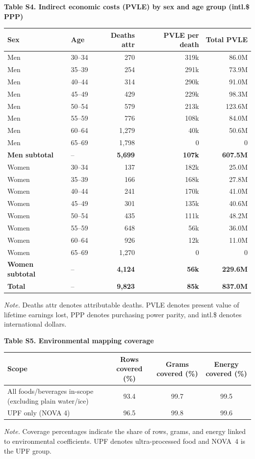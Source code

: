 ﻿\documentclass{article}
\newcommand{\manualtablecaption}[1]{%
  \par\centering\textbf{#1}\par\vspace{0.4em}%
}
\newcommand{\tabnote}[1]{%
  \vspace{0.06cm}%
  {\footnotesize\setstretch{1}\par\raggedright\textit{Note.} #1\par}%
}
\begin{document}
\vspace{0.8em}
\begin{table}[!htbp]
\centering
\manualtablecaption{Table S4. Indirect economic costs (PVLE) by sex and age group (intl.\$ PPP)}
\begin{tabular}{l l r r r}
\toprule
\textbf{Sex} & \textbf{Age} & \textbf{Deaths attr} & \textbf{PVLE per death} & \textbf{Total PVLE}\\
\midrule
Men & 30--34 & 270 & 319k & 86.0M\\
Men & 35--39 & 254 & 291k & 73.9M\\
Men & 40--44 & 314 & 290k & 91.0M\\
Men & 45--49 & 429 & 229k & 98.3M\\
Men & 50--54 & 579 & 213k & 123.6M\\
Men & 55--59 & 776 & 108k & 84.0M\\
Men & 60--64 & 1,279 & 40k & 50.6M\\
Men & 65--69 & 1,798 & 0 & 0\\
\textbf{Men subtotal} & -- & \textbf{5,699} & \textbf{107k} & \textbf{607.5M}\\
Women & 30--34 & 137 & 182k & 25.0M\\
Women & 35--39 & 166 & 168k & 27.8M\\
Women & 40--44 & 241 & 170k & 41.0M\\
Women & 45--49 & 301 & 135k & 40.6M\\
Women & 50--54 & 435 & 111k & 48.2M\\
Women & 55--59 & 648 & 56k & 36.0M\\
Women & 60--64 & 926 & 12k & 11.0M\\
Women & 65--69 & 1,270 & 0 & 0\\
\textbf{Women subtotal} & -- & \textbf{4,124} & \textbf{56k} & \textbf{229.6M}\\
\midrule
\textbf{Total} & -- & \textbf{9,823} & \textbf{85k} & \textbf{837.0M}\\
\bottomrule
\end{tabular}
\tabnote{Deaths attr denotes attributable deaths. PVLE denotes present value of lifetime earnings lost, PPP denotes purchasing power parity, and intl.\$ denotes international dollars.}
\end{table}

\vspace{0.8em}
\begin{table}[!htbp]
\centering
\manualtablecaption{Table S5. Environmental mapping coverage}
\begin{tabular}{p{6.0cm}ccc}
\toprule
\textbf{Scope} & \textbf{Rows covered (\%)} & \textbf{Grams covered (\%)} & \textbf{Energy covered (\%)}\\
\midrule
All foods/beverages in-scope (excluding plain water/ice) & 93.4 & 99.7 & 99.5\\
UPF only (NOVA 4) & 96.5 & 99.8 & 99.6\\
\bottomrule
\end{tabular}
\tabnote{Coverage percentages indicate the share of rows, grams, and energy linked to environmental coefficients. UPF denotes ultra-processed food and NOVA~4 is the UPF group.}
\end{table}
\end{document}
